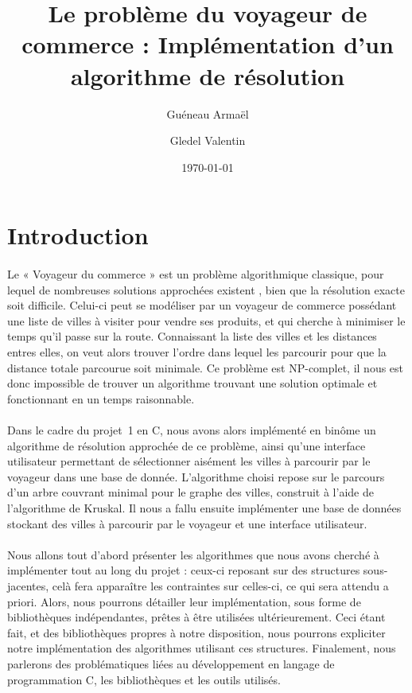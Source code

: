 \documentclass[a4paper]{article}
\title{Le problème du voyageur de commerce : Implémentation d'un algorithme de résolution}
\author{Guéneau Armaël \and Gledel Valentin}
\date{\today}
\begin{document}
\maketitle

\tableofcontents

\newpage

\section*{Introduction}

\paragraph*{}
Le « Voyageur du commerce » est un problème algorithmique classique, pour lequel de nombreuses solutions approchées existent , bien que la résolution exacte soit difficile. Celui-ci peut se modéliser par un voyageur de commerce possédant une liste de villes à visiter pour vendre ses produits, et qui cherche à minimiser le temps qu’il passe sur la route. Connaissant la liste des villes et les distances entres elles, on veut alors trouver l’ordre dans lequel les parcourir pour que la distance totale parcourue soit minimale. Ce problème est NP-complet, il nous est donc impossible de trouver un algorithme trouvant une solution optimale et fonctionnant en un temps raisonnable.
\paragraph*{}
Dans le cadre du projet~1 en C, nous avons alors implémenté en binôme un algorithme de résolution approchée de ce problème, ainsi qu’une interface utilisateur permettant de sélectionner aisément les villes à parcourir par le voyageur dans une base de donnée.
L’algorithme choisi repose sur le parcours d'un arbre couvrant minimal pour le graphe des villes, construit à l'aide de l'algorithme de Kruskal. Il nous a fallu ensuite implémenter une base de données stockant des villes à parcourir par le voyageur et une interface utilisateur.
\paragraph*{}
Nous allons tout d’abord présenter les algorithmes que nous avons cherché à implémenter tout au long du projet : ceux-ci reposant sur des structures sous-jacentes, celà fera apparaître les contraintes sur celles-ci, ce qui sera attendu a priori. Alors, nous pourrons détailler leur implémentation, sous forme de bibliothèques indépendantes, prêtes à être utilisées ultérieurement. Ceci étant fait, et des bibliothèques propres à notre disposition, nous pourrons expliciter notre implémentation des algorithmes utilisant ces structures. Finalement, nous parlerons des problématiques liées au développement en langage de programmation C, les bibliothèques et les outils utilisés.
\end{document}
